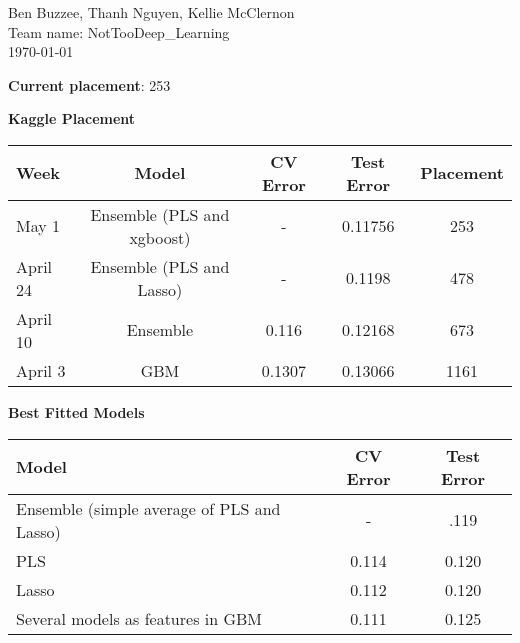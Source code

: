 \documentclass[12pt]{article}
\begin{document}
\noindent
Ben Buzzee, Thanh Nguyen, Kellie McClernon \\
Team name: NotTooDeep\_Learning \\
\today
\vspace{0.5 cm}

\textbf{Current placement}: 253

\textbf{Kaggle Placement}
\begin{center}
\begin{tabular}{l c c c c}
\hline
Week & Model & CV Error & Test Error & Placement \\
\hline
May 1 & Ensemble (PLS and xgboost) & - & 0.11756 & 253 \\
April 24 & Ensemble (PLS and Lasso) & - & 0.1198 & 478\\
April 10 & Ensemble & 0.116 & 0.12168 & 673 \\
April 3 & GBM & 0.1307 & 0.13066 & 1161 \\
\hline
\end{tabular}
\end{center}

\textbf{Best Fitted Models}
\begin{center}
\begin{tabular}{l c c}
	\hline
	Model & CV Error & Test Error \\
	\hline
	Ensemble (simple average of PLS and Lasso) & - & .119 \\
	PLS & 0.114 & 0.120 \\
	Lasso & 0.112 & 0.120 \\
	Several models as features in GBM & 0.111 & 0.125 \\
	\hline
\end{tabular}
\end{center}

\end{document}
